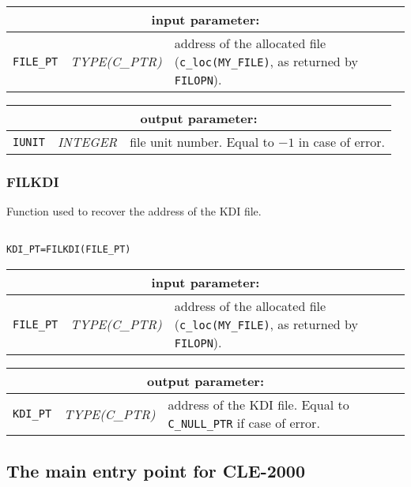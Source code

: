 \noindent
\begin{tabular}{|p{1.5cm}|p{3cm}|p{10cm}|}
\hline
\multicolumn{3}{|c|}{\bf input parameter:} \\
\hline
{\tt FILE\_PT} & {\it TYPE(C\_PTR)} &  address of the allocated file ({\tt c\_loc(MY\_FILE)}, as returned by {\tt FILOPN}). \\
\hline
\end{tabular}

\vskip 0.4cm
\noindent
\begin{tabular}{|p{1.5cm}|p{3cm}|p{10cm}|}
\hline
\multicolumn{3}{|c|}{\bf output parameter:} \\
\hline
{\tt IUNIT} & {\it INTEGER}  & file unit number. Equal to $-1$ in case of error. \\
\hline
\end{tabular}

\subsubsection{FILKDI}

Function used to recover the address of the KDI file.

\begin{verbatim}

KDI_PT=FILKDI(FILE_PT)
\end{verbatim}

\noindent
\begin{tabular}{|p{1.5cm}|p{3cm}|p{10cm}|}
\hline
\multicolumn{3}{|c|}{\bf input parameter:} \\
\hline
{\tt FILE\_PT} & {\it TYPE(C\_PTR)} &  address of the allocated file ({\tt c\_loc(MY\_FILE)}, as returned by {\tt FILOPN}). \\
\hline
\end{tabular}

\vskip 0.4cm
\noindent
\begin{tabular}{|p{1.5cm}|p{3cm}|p{10cm}|}
\hline
\multicolumn{3}{|c|}{\bf output parameter:} \\
\hline
{\tt KDI\_PT} & {\it TYPE(C\_PTR)}  & address of the KDI file. Equal to {\tt C\_NULL\_PTR} if case of error.  \\
\hline
\end{tabular}

\subsection {The main entry point for CLE-2000}

